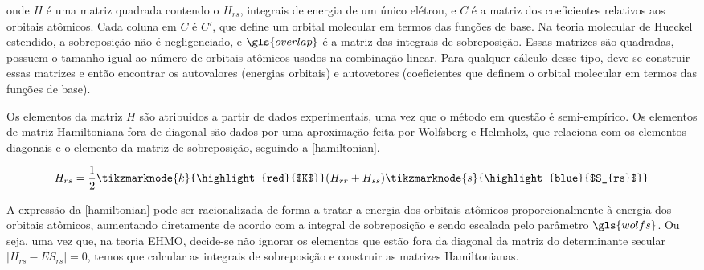 \noindent onde $H$ é uma matriz quadrada contendo o $H_{rs}$, integrais de energia de um único elétron, e $C$ é a matriz dos coeficientes relativos aos orbitais atômicos. Cada coluna em $C$ é $C'$, que define um orbital molecular em termos das funções de base. Na teoria molecular de Hueckel estendido, a sobreposição não é negligenciado, e $\gls{overlap}$ é a matriz das integrais de sobreposição. Essas matrizes são quadradas, possuem o tamanho igual ao número de orbitais atômicos usados na combinação linear. Para qualquer cálculo desse tipo, deve-se construir essas matrizes e então encontrar os autovalores (energias orbitais) e autovetores (coeficientes que definem o orbital molecular em termos das funções de base).

Os elementos da matriz $H$ são atribuídos a partir de dados experimentais, uma vez que o método em questão é semi-empírico. Os elementos de matriz Hamiltoniana fora de diagonal são dados por uma aproximação feita por Wolfsberg e Helmholz, que relaciona com os elementos diagonais e o elemento da matriz de sobreposição, seguindo a \autoref{hamiltonian}.

\begin{figure}[htb]
\label{hamiltonian}
    \vspace{2\baselineskip}
\begin{equation}
    H_{rs} = \frac{1}{2} \tikzmarknode{k}{\highlight{red}{$K$}}(H_{rr} + H_{ss}) \tikzmarknode{s}{\highlight{blue}{$S_{rs}$}}
\end{equation}
\end{figure}

A expressão da \autoref{hamiltonian} pode ser racionalizada de forma a tratar a energia dos orbitais atômicos proporcionalmente à energia dos orbitais atômicos, aumentando diretamente de acordo com a integral de sobreposição e sendo escalada pelo parâmetro $\gls{wolfs}$. Ou seja, uma vez que, na teoria \gls{EHMO}, decide-se não ignorar os elementos que estão fora da diagonal da matriz do determinante secular $|H_{rs} - ES_{rs}| = 0$, temos que calcular as integrais de sobreposição e construir as matrizes Hamiltonianas.

